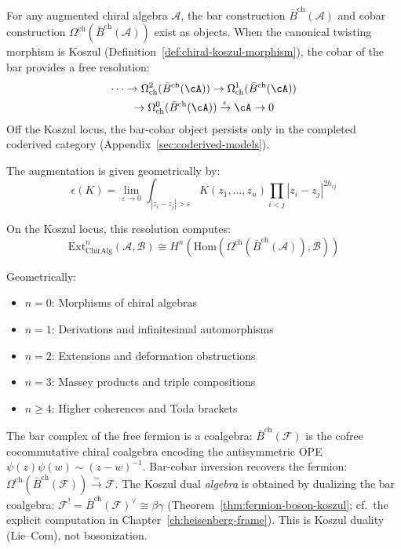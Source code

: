 \begin{theorem}
\label{thm:cobar-resolution-scoped}
For any augmented chiral algebra $\mathcal{A}$, the bar construction
$\bar{B}^{\mathrm{ch}}(\mathcal{A})$ and cobar construction
$\Omega^{\mathrm{ch}}(\bar{B}^{\mathrm{ch}}(\mathcal{A}))$ exist as objects.
When the canonical twisting morphism is Koszul
\textup{(}Definition~\textup{\ref{def:chiral-koszul-morphism})},
the cobar of the bar provides a free resolution:
\begin{multline*}
\cdots \to \Omega^2_{\mathrm{ch}}(\bar{B}^{\mathrm{ch}}(\cA))
\to \Omega^1_{\mathrm{ch}}(\bar{B}^{\mathrm{ch}}(\cA))\\
\to \Omega^0_{\mathrm{ch}}(\bar{B}^{\mathrm{ch}}(\cA))
\xrightarrow{\epsilon} \cA \to 0
\end{multline*}
Off the Koszul locus, the bar-cobar object persists only in the
completed coderived category
\textup{(}Appendix~\textup{\ref{sec:coderived-models})}.

The augmentation is given geometrically by:
\[\epsilon(K) = \lim_{\varepsilon \to 0} \int_{|z_i - z_j| > \varepsilon} K(z_1, \ldots, z_n) \prod_{i<j} |z_i - z_j|^{2h_{ij}}\]
\end{theorem}

\begin{remark}
On the Koszul locus, this resolution computes:
\[\text{Ext}^n_{\text{ChirAlg}}(\mathcal{A}, \mathcal{B}) \cong H^n(\text{Hom}(\Omega^{\text{ch}}(\bar{B}^{\text{ch}}(\mathcal{A})), \mathcal{B}))\]

Geometrically:
\begin{itemize}
\item $n = 0$: Morphisms of chiral algebras
\item $n = 1$: Derivations and infinitesimal automorphisms
\item $n = 2$: Extensions and deformation obstructions
\item $n = 3$: Massey products and triple compositions
\item $n \geq 4$: Higher coherences and Toda brackets
\end{itemize}
\end{remark}

\begin{example}
The bar complex of the free fermion is a coalgebra:
$\bar{B}^{\mathrm{ch}}(\mathcal{F})$ is the cofree cocommutative
chiral coalgebra encoding the antisymmetric OPE
$\psi(z)\psi(w) \sim (z{-}w)^{-1}$. Bar-cobar inversion recovers
the fermion:
$\Omega^{\mathrm{ch}}(\bar{B}^{\mathrm{ch}}(\mathcal{F}))
\xrightarrow{\sim} \mathcal{F}$.
The Koszul dual \emph{algebra} is obtained by dualizing the bar
coalgebra:
$\mathcal{F}^! = \bar{B}^{\mathrm{ch}}(\mathcal{F})^\vee
\cong \beta\gamma$
(Theorem~\ref{thm:fermion-boson-koszul};
cf.\ the explicit computation in Chapter~\ref{ch:heisenberg-frame}).
This is Koszul duality (Lie--Com), not bosonization.
\end{example}

